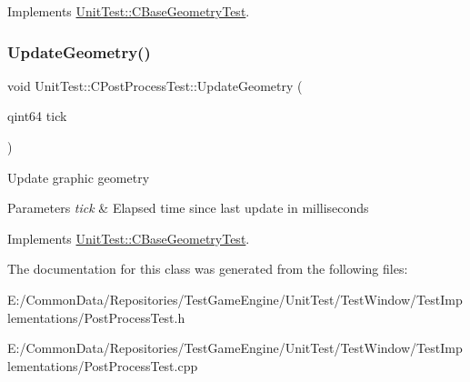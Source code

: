 Implements \mbox{\hyperlink{class_unit_test_1_1_c_base_geometry_test_a16e5804e7f134ae519722c47e756e3b0}{Unit\+Test\+::\+C\+Base\+Geometry\+Test}}.

\mbox{\label{class_unit_test_1_1_c_post_process_test_aa1da5079813a860b1cc8a3554bce6f04}} 
\subsubsection{\texorpdfstring{UpdateGeometry()}{UpdateGeometry()}}
{\footnotesize\ttfamily void Unit\+Test\+::\+C\+Post\+Process\+Test\+::\+Update\+Geometry (\begin{DoxyParamCaption}\item[{qint64}]{tick }\end{DoxyParamCaption})\hspace{0.3cm}{\ttfamily [virtual]}}

Update graphic geometry 
\begin{DoxyParams}{Parameters}
{\em tick} & Elapsed time since last update in milliseconds \\
\hline
\end{DoxyParams}


Implements \mbox{\hyperlink{class_unit_test_1_1_c_base_geometry_test_afe9560d667ef457f7a203453c10593fd}{Unit\+Test\+::\+C\+Base\+Geometry\+Test}}.



The documentation for this class was generated from the following files\+:\begin{DoxyCompactItemize}
\item 
E\+:/\+Common\+Data/\+Repositories/\+Test\+Game\+Engine/\+Unit\+Test/\+Test\+Window/\+Test\+Implementations/Post\+Process\+Test.\+h\item 
E\+:/\+Common\+Data/\+Repositories/\+Test\+Game\+Engine/\+Unit\+Test/\+Test\+Window/\+Test\+Implementations/Post\+Process\+Test.\+cpp\end{DoxyCompactItemize}
